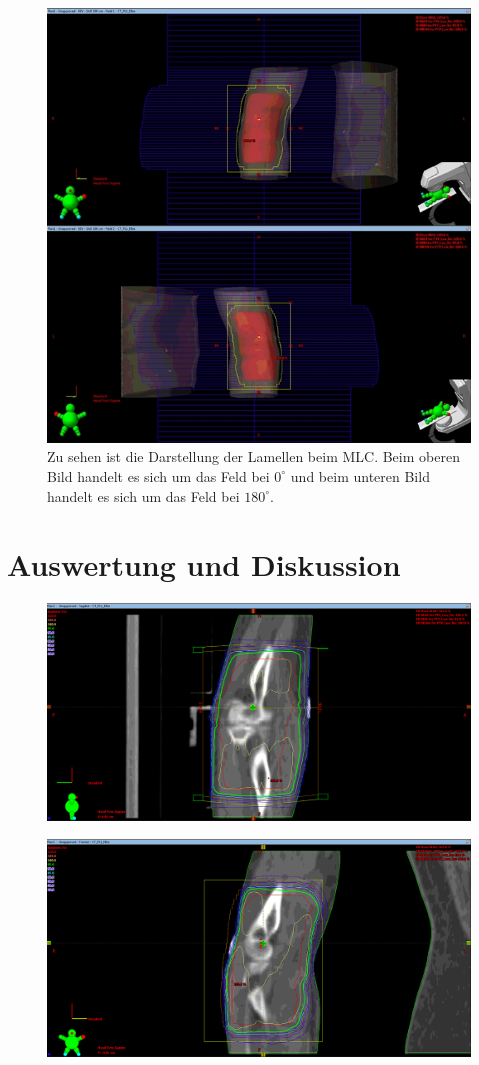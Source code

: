\begin{figure}[htpb]
	\centering
	\includegraphics[width=0.7\linewidth]{../Bilder/kombi}
	\caption{Zu sehen ist die Darstellung der Lamellen beim MLC. Beim oberen Bild handelt es sich um das Feld bei $0^\circ$ und beim unteren Bild handelt es sich um das Feld bei $180^\circ$.}
	\label{fig:kombi}
\end{figure}


\section{Auswertung und Diskussion}
\label{sec:AuswertundDiskussion}

\begin{figure}[htpb]
	\centering
	\includegraphics[width=0.7\linewidth]{../Bilder/EllenbogenX}
	\caption{}
	\label{fig:ellenbogenx}
\end{figure}

\begin{figure}[htpb]
	\centering
	\includegraphics[width=0.7\linewidth]{../Bilder/EllenbogenY}
	\caption{}
	\label{fig:ellenbogeny}
\end{figure}

